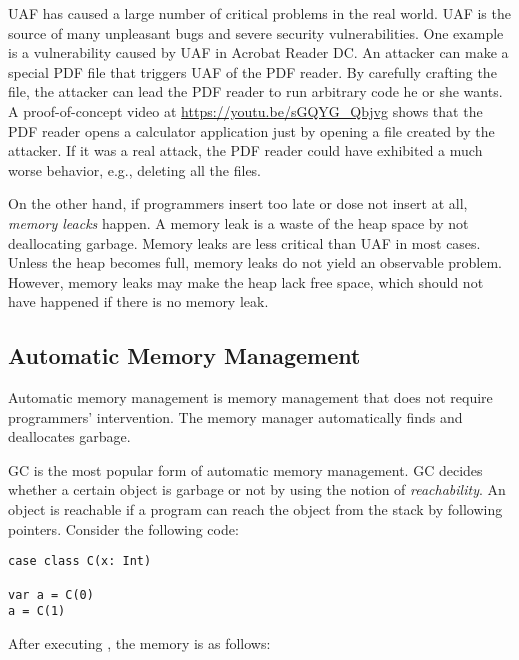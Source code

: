 UAF has caused a large number of critical problems in the real world. UAF is the
source of many unpleasant bugs and severe security vulnerabilities.  One example
is a vulnerability caused by UAF in Acrobat Reader
DC.
An attacker can make a special PDF file that triggers UAF of the PDF reader. By
carefully crafting the file, the attacker can lead the PDF reader to run
arbitrary code he or she wants. A proof-of-concept video at
\url{https://youtu.be/sGQYG_Qbjvg} shows that the PDF reader opens a calculator
application just by opening a file created by the attacker. If it was a real
attack, the PDF reader could have exhibited a much worse behavior, e.g.,
deleting all the files.

On the other hand, if programmers insert  too late or dose not insert
at all, \textit{memory leacks} happen. A memory leak is a
waste of the heap space by not deallocating garbage. Memory leaks are less
critical than UAF in most cases. Unless the heap becomes full, memory leaks do
not yield an observable problem. However, memory leaks may make the heap lack
free space, which should not have happened if there is no memory leak.

\subsection{Automatic Memory Management}

Automatic memory management is memory management that does not require
programmers' intervention. The memory manager automatically finds and
deallocates garbage.

GC is the most popular form of automatic memory management. GC decides whether
a certain object is garbage or not by using the notion of
\textit{reachability}. An object is reachable if a program
can reach the object from the stack by following pointers. Consider the
following code:

\begin{verbatim}
case class C(x: Int)

var a = C(0)
a = C(1)
\end{verbatim}

After executing , the memory is as follows:

